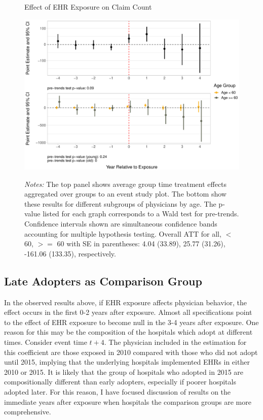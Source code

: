 \documentclass[12pt]{article}
\begin{document}
\begin{figure}[ht]
    \centering
    \captionsetup{width=.85\linewidth}
    \caption{Effect of EHR Exposure on Claim Count}
    \includegraphics[scale=.6]{Objects/claim_plot.pdf}
    \label{fig:claim}
    \vspace{2mm}
    \caption*{\footnotesize{\textit{Notes:} The top panel shows average group time treatment effects aggregated over groups to an event study plot. The bottom show these results for different subgroups of physicians by age. The p-value listed for each graph corresponds to a Wald test for pre-trends. Confidence intervals shown are simultaneous confidence bands accounting for multiple hypothesis testing. Overall ATT for all, $<$ 60, $>=$ 60 with SE in parentheses: 4.04 (33.89), 25.77 (31.26), -161.06 (133.35), respectively.}}
\end{figure}


\subsection{Late Adopters as Comparison Group}

In the observed results above, if EHR exposure affects physician behavior, the effect occurs in the first 0-2 years after exposure. Almost all specifications point to the effect of EHR exposure to become null in the 3-4 years after exposure. One reason for this may be the composition of the hospitals which adopt at different times. Consider event time $t+4$. The physician included in the estimation for this coefficient are those exposed in 2010 compared with those who did not adopt until 2015, implying that the underlying hospitals implemented EHRs in either 2010 or 2015. It is likely that the group of hospitals who adopted in 2015 are compositionally different than early adopters, especially if poorer hospitals adopted later. For this reason, I have focused discussion of results on the immediate years after exposure when hospitals the comparison groups are more comprehensive. 
\end{document}
